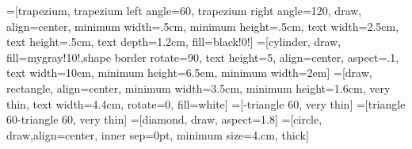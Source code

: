                     
                    

=[trapezium, trapezium left angle=60, trapezium right angle=120, draw, align=center, minimum width=.5cm, minimum height=.5cm, text width=2.5cm, text height=.5cm, text depth=1.2cm, fill=black!0!]
=[cylinder, draw, fill=mygray!10!,shape border rotate=90, text height=5, align=center, aspect=.1, text width=10em, minimum height=6.5em, minimum width=2em]
=[draw, rectangle, align=center, minimum width=3.5cm, minimum height=1.6cm, very thin, text width=4.4cm, rotate=0, fill=white]
=[-triangle 60, very thin]
=[triangle 60-triangle 60, very thin]
=[diamond, draw, aspect=1.8]
=[circle, draw,align=center,  inner sep=0pt, minimum size=4.cm, thick]